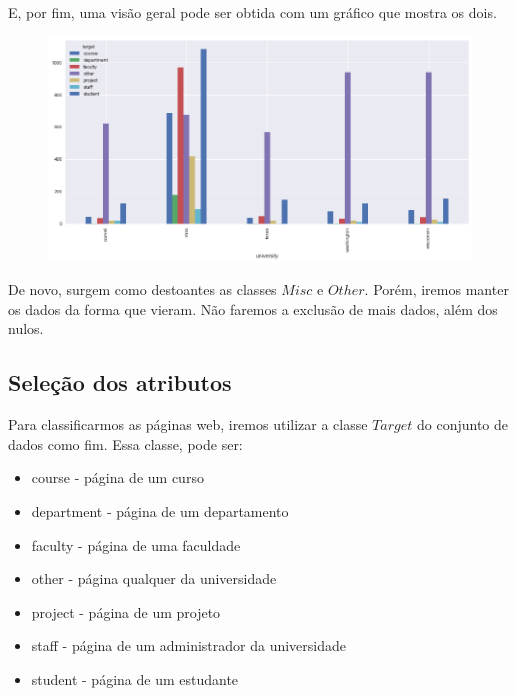 \documentclass [12pt, a4paper] {article}
\begin{document}
E, por fim, uma visão geral pode ser obtida com um gráfico que mostra os dois.

\begin{figure}[!hbt]
		\begin{center}
		\includegraphics[width=1\columnwidth]{figuras/dados.png}
		\end{center}
\end{figure}

De novo, surgem como destoantes as classes $Misc$ e $Other$. Porém, iremos manter os dados da forma que vieram. Não faremos a exclusão de mais dados, além dos nulos.














\subsection{Seleção dos atributos}

Para classificarmos as páginas web, iremos utilizar a classe $Target$ do conjunto de dados como fim. Essa classe, pode ser:

\begin{itemize}
\item course - página de um curso
\item department - página de um departamento
\item faculty	- página de uma faculdade
\item other - página qualquer da universidade
\item project	- página de um projeto
\item staff - página de um administrador da universidade
\item student	- página de um estudante
\end{itemize}
\end{document}
